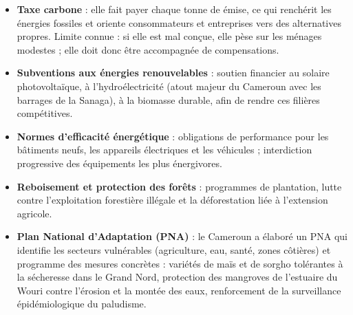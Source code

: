 \documentclass[11pt]{article}
\begin{document}
\begin{exemplebox}
\begin{itemize}
\item \textbf{Taxe carbone} : elle fait payer chaque tonne de  émise, ce qui renchérit les énergies fossiles et oriente consommateurs et entreprises vers des alternatives propres. Limite connue : si elle est mal conçue, elle pèse sur les ménages modestes ; elle doit donc être accompagnée de compensations.
\item \textbf{Subventions aux énergies renouvelables} : soutien financier au solaire photovoltaïque, à l'hydroélectricité (atout majeur du Cameroun avec les barrages de la Sanaga), à la biomasse durable, afin de rendre ces filières compétitives.
\item \textbf{Normes d'efficacité énergétique} : obligations de performance pour les bâtiments neufs, les appareils électriques et les véhicules ; interdiction progressive des équipements les plus énergivores.
\item \textbf{Reboisement et protection des forêts} : programmes de plantation, lutte contre l'exploitation forestière illégale et la déforestation liée à l'extension agricole.
\item \textbf{Plan National d'Adaptation (PNA)} : le Cameroun a élaboré un PNA qui identifie les secteurs vulnérables (agriculture, eau, santé, zones côtières) et programme des mesures concrètes : variétés de maïs et de sorgho tolérantes à la sécheresse dans le Grand Nord, protection des mangroves de l'estuaire du Wouri contre l'érosion et la montée des eaux, renforcement de la surveillance épidémiologique du paludisme.
\end{itemize}
\end{exemplebox}
\end{document}

